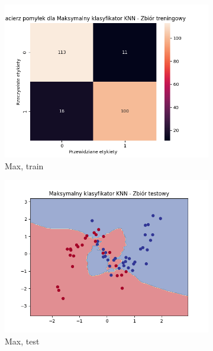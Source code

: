 \documentclass[12pt]{article}
\newcommand*{\subfigwidth}{0.24\textwidth}
\begin{document}
\begin{figure}[H]
\begin{subfigure}[t]{\subfigwidth}
        \includegraphics[width=\linewidth]{img/exp_2/knn/2_3/max/train_matrix.png}
        \caption{Max, train}
    \end{subfigure}
    \hfill
    \begin{subfigure}[t]{\subfigwidth}
        \includegraphics[width=\linewidth]{img/exp_2/knn/2_3/max/test_boundary.png}
        \caption{Max, test}
    \end{subfigure}
    \hfill
    \begin{subfigure}[t]{\subfigwidth}

\end{subfigure}
\end{figure}
\end{document}
